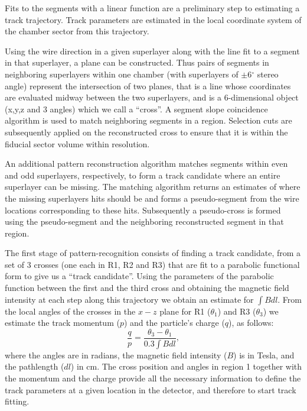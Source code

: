 \documentclass{elsart}
\begin{document}
Fits to the segments with a linear function are a preliminary step to estimating
a track trajectory. Track parameters are estimated in the local coordinate system of the chamber sector from
this trajectory. 

Using the wire direction in a given superlayer along with the line fit to a segment in that superlayer, a plane can be constructed. 
Thus pairs of segments in
neighboring superlayers within one chamber (with superlayers of $\pm$6$^\circ$ stereo angle) represent the
intersection of two planes, that is a line whose coordinates are evaluated midway between the two
superlayers, and is a 6-dimensional object (x,y,z and 3 angles) which we call a ``cross''. 
A segment slope coincidence algorithm is used to match neighboring segments in a region.  Selection cuts are subsequently applied on the 
reconstructed cross to ensure that it is within the fiducial sector volume within resolution. 

An additional  pattern reconstruction algorithm  matches segments within even and odd superlayers, respectively, to form
a track candidate where an entire superlayer can be missing.  The matching algorithm returns an estimates of where the missing
superlayers hits should be and forms a pseudo-segment from the wire locations corresponding to these hits.  Subsequently 
a pseudo-cross is formed using the pseudo-segment and the neighboring reconstructed segment in that region. 

The first stage of
pattern-recognition consists of finding a track candidate, from a set of 3 crosses (one each in R1, R2 and R3) that
are fit to a parabolic functional form to give us a ``track candidate''.  
Using the parameters of the parabolic function between the first and the third cross and obtaining the magnetic field 
intensity at each step along this trajectory we obtain an estimate for $\int B dl$. 
From the local angles of the crosses in the $x-z$ plane for R1 ($\theta_1$) and R3 ($\theta_3$) we estimate the track momentum ($p$)
and the particle's charge ($q$),
as follows:
$$\frac{q}{p} = \frac{\theta_3 - \theta_1}{0.3\int{B dl}},$$ where the angles are in radians, the magnetic field 
intensity ($B$) is in Tesla, and the pathlength ($dl$) in cm.  
 The cross position and angles in region 1 together with the 
momentum and the charge provide all the necessary information to define the track parameters at a given location in the detector, 
and therefore to start track fitting.
\end{document}
